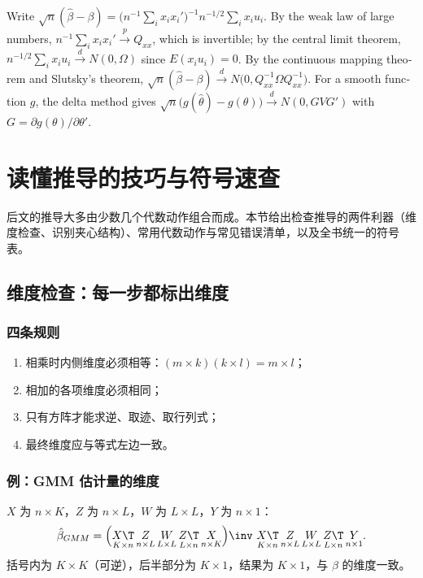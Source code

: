 \begin{english}
Write $\sqrt n(\hat\beta-\beta)=\big(n^{-1}\sum_ix_ix_i'\big)^{-1}n^{-1/2}\sum_ix_iu_i$. By the weak law of large numbers, $n^{-1}\sum_ix_ix_i'\xrightarrow{p}Q_{xx}$, which is invertible; by the central limit theorem, $n^{-1/2}\sum_ix_iu_i\xrightarrow{d}N(0,\Omega)$ since $E(x_iu_i)=0$. By the continuous mapping theorem and Slutsky's theorem, $\sqrt n(\hat\beta-\beta)\xrightarrow{d}N\big(0,Q_{xx}^{-1}\Omega Q_{xx}^{-1}\big)$. For a smooth function $g$, the delta method gives $\sqrt n\big(g(\hat\theta)-g(\theta)\big)\xrightarrow{d}N(0,GVG')$ with $G=\partial g(\theta)/\partial\theta'$.
\end{english}

\section{读懂推导的技巧与符号速查}\label{sec:U01b-read}

后文的推导大多由少数几个代数动作组合而成。本节给出检查推导的两件利器（维度检查、识别夹心结构）、常用代数动作与常见错误清单，以及全书统一的符号表。

\subsection{维度检查：每一步都标出维度}

\subsubsection{四条规则}

\begin{enumerate}
  \item 相乘时内侧维度必须相等：$(m\times k)(k\times l)=m\times l$；
  \item 相加的各项维度必须相同；
  \item 只有方阵才能求逆、取迹、取行列式；
  \item 最终维度应与等式左边一致。
\end{enumerate}

\subsubsection{例：GMM 估计量的维度}

$X$ 为 $n\times K$，$Z$ 为 $n\times L$，$W$ 为 $L\times L$，$Y$ 为 $n\times1$：
\[
\hat\beta_{GMM}=\Big(\underset{K\times n}{X\T}\,\underset{n\times L}{Z}\,\underset{L\times L}{W}\,\underset{L\times n}{Z\T}\,\underset{n\times K}{X}\Big)\inv\ \underset{K\times n}{X\T}\,\underset{n\times L}{Z}\,\underset{L\times L}{W}\,\underset{L\times n}{Z\T}\,\underset{n\times 1}{Y}.
\]
括号内为 $K\times K$（可逆），后半部分为 $K\times1$，结果为 $K\times1$，与 $\beta$ 的维度一致。

